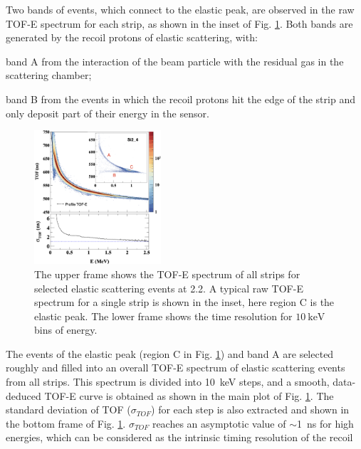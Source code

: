 \documentclass[number,5p]{elsarticle}
\begin{document}
Two bands of events, which connect to the elastic peak, are observed in the raw TOF-E spectrum for each strip, as shown in the inset of Fig. \ref{fig:tof-e}.
Both bands are generated by the recoil protons of elastic scattering, with:
\begin{enumerate*}[label=(\roman*)]
\item band A from the interaction of the beam particle with the residual gas in the scattering chamber;
\item band B from the events in which the recoil protons hit the edge of the strip and only deposit part of their energy in the sensor.
\end{enumerate*}
\begin{figure}[b!]
  \centering
  \includegraphics[width=0.42\textwidth]{./tofe_tsigma.png}
  \caption{
    The upper frame shows the TOF-E spectrum of all strips for selected elastic
    scattering events at \SI{2.2}{\momentum}.
    A typical raw TOF-E spectrum for a single strip is shown in the inset, here region C is the elastic peak.
    The lower frame shows the time resolution for $\SI{10}{\keV}$ bins of energy.
    }
  \label{fig:tof-e}
\end{figure}
The events of the elastic peak (region C in Fig. \ref{fig:tof-e}) and band A are selected roughly and filled into an overall TOF-E spectrum of elastic scattering events from all strips.
This spectrum is divided into \SI{10}{\keV} steps,  and a smooth, data-deduced TOF-E curve is obtained as shown in the main plot of Fig. \ref{fig:tof-e}.
The standard deviation of TOF ($\sigma_{TOF}$) for each step is also extracted and shown in the bottom frame of Fig. \ref{fig:tof-e}.
$\sigma_{TOF}$ reaches an asymptotic value of $\sim$\SI{1}{\ns} for high energies, which can be considered as the intrinsic timing resolution of the recoil
\end{document}

